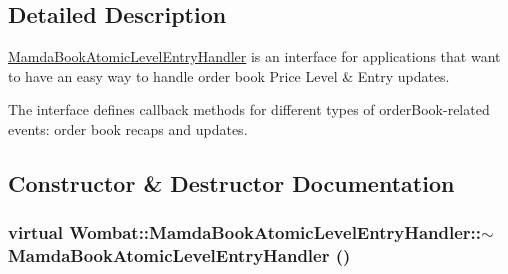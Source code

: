 \subsection{Detailed Description}
\hyperlink{classWombat_1_1MamdaBookAtomicLevelEntryHandler}{Mamda\-Book\-Atomic\-Level\-Entry\-Handler} is an interface for applications that want to have an easy way to handle order book Price Level \& Entry updates. 

The interface defines callback methods for different types of order\-Book-related events: order book recaps and updates. 



\subsection{Constructor \& Destructor Documentation}
\hypertarget{classWombat_1_1MamdaBookAtomicLevelEntryHandler_9192c0bbed11d9a84680eb024b0a908f}{
\subsubsection[$\sim$MamdaBookAtomicLevelEntryHandler]{\setlength{\rightskip}{0pt plus 5cm}virtual Wombat::Mamda\-Book\-Atomic\-Level\-Entry\-Handler::$\sim$Mamda\-Book\-Atomic\-Level\-Entry\-Handler ()}}
\label{classWombat_1_1MamdaBookAtomicLevelEntryHandler_9192c0bbed11d9a84680eb024b0a908f}




